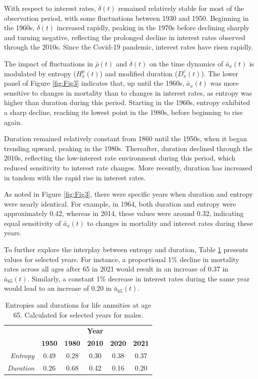 \documentclass[12pt]{article}
\begin{document}
With respect to interest rates, \( \dot{\delta}(t) \) remained relatively stable for most of the observation period, with some fluctuations between 1930 and 1950. Beginning in the 1960s, \( \dot{\delta}(t) \) increased rapidly, peaking in the 1970s before declining sharply and turning negative, reflecting the prolonged decline in interest rates observed through the 2010s. Since the Covid-19 pandemic, interest rates have risen rapidly.

The impact of fluctuations in \( \bar{\rho}(t) \) and \( \dot{\delta}(t) \) on the time dynamics of \( \bar{a}_x(t) \) is modulated by entropy (\( {H}^{p}_x(t) \)) and modified duration (\( {D}^{c}_x(t) \)). The lower panel of Figure \ref{fig:Fig3} indicates that, up until the 1960s, \( \bar{a}_x(t) \) was more sensitive to changes in mortality than to changes in interest rates, as entropy was higher than duration during this period. Starting in the 1960s, entropy exhibited a sharp decline, reaching its lowest point in the 1980s, before beginning to rise again.

Duration remained relatively constant from 1860 until the 1950s, when it began trending upward, peaking in the 1980s. Thereafter, duration declined through the 2010s, reflecting the low-interest rate environment during this period, which reduced sensitivity to interest rate changes. More recently, duration has increased in tandem with the rapid rise in interest rates.

As noted in Figure \ref{fig:Fig3}, there were specific years when duration and entropy were nearly identical. For example, in 1964, both duration and entropy were approximately 0.42, whereas in 2014, these values were around 0.32, indicating equal sensitivity of \( \bar{a}_x(t) \) to changes in mortality and interest rates during these years.

To further explore the interplay between entropy and duration, Table \ref{tab:entropyDuration} presents values for selected years. For instance, a proportional 1\% decline in mortality rates across all ages after 65 in 2021 would result in an increase of 0.37 in \( \bar{a}_{65}(t) \). Similarly, a constant 1\% decrease in interest rates during the same year would lead to an increase of 0.20 in \( \bar{a}_{65}(t) \).



\begin{table}[ht]
	\begin{tabular}{rccccc}
		\toprule
		& \multicolumn{5}{c}{\textbf{Year}}  \\

		& \textbf{1950} & \textbf{1980} & \textbf{2010 }& \textbf{2020} & \textbf{2021} \\
\hline
	\textit{Entropy} &  0.49    & 0.28     & 0.30     &   0.38 & 0.37  \\
	
		\textit{Duration} &  0.26    & 0.68     &  0.42    &     0.16 & 0.20\\
\bottomrule
	\end{tabular}
	 \caption{Entropies and durations for life annuities at age 65. Calculated for selected years for males.}
	\label{tab:entropyDuration}   
\end{table}
\end{document}
